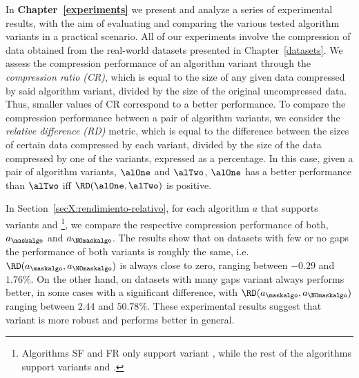 In \textbf{Chapter~\ref{experiments}} we present and analyze a series of experimental results, with the aim of evaluating and comparing the various tested algorithm variants in a practical scenario. All of our experiments involve the compression of data obtained from the real-world datasets presented in Chapter~\ref{datasets}. We assess the compression performance of an algorithm variant through the \textit{compression ratio (CR)}, which is equal to the size of any given data compressed by said algorithm variant, divided by the size of the original uncompressed data. Thus, smaller values of CR correspond to a better performance. To compare the compression performance between a pair of algorithm variants, we consider the \textit{relative difference (RD)} metric, which is equal to the difference between the sizes of certain data compressed by each variant, divided by the size of the data compressed by one of the variants, expressed as a percentage. In this case, given a pair of algorithm variants, $\alOne$ and $\alTwo$, $\alOne$ has a better performance than $\alTwo$ iff $\RD(\alOne, \alTwo)$ is positive.


\newcommand{\footSupportBoth}{\footnote{Algorithms SF and FR only support variant \maskalgo, while the rest of the algorithms support variants \maskalgo and \NOmaskalgo.}}


In Section~\ref{secX:rendimiento-relativo}, for each algorithm $a$ that supports variants \maskalgo and \NOmaskalgo\footSupportBoth, we compare the respective compression performance of both, $a_\maskalgo$ and $a_\NOmaskalgo$. The results show that on datasets with few or no gaps the performance of both variants is roughly the same, i.e. $\RD(a_\maskalgo, a_\NOmaskalgo)$ is always close to zero, ranging between $-0.29$ and $1.76\%$. On the other hand, on datasets with many gaps variant \maskalgo always performs better, in some cases with a significant difference, with $\RD(a_\maskalgo, a_\NOmaskalgo)$ ranging between $2.44$ and $50.78\%$. These experimental results suggest that variant \maskalgo is more robust and performs better in general.


\newcommand{\footSupportFocus}{\footnote{\label{note1}Due to the results obtained in Section~\ref{secX:rendimiento-relativo}, our experiments in the subsequent sections in Chapter~\ref{experiments} focus on studying the compression performance of variant \maskalgo of the algorithms.}}


